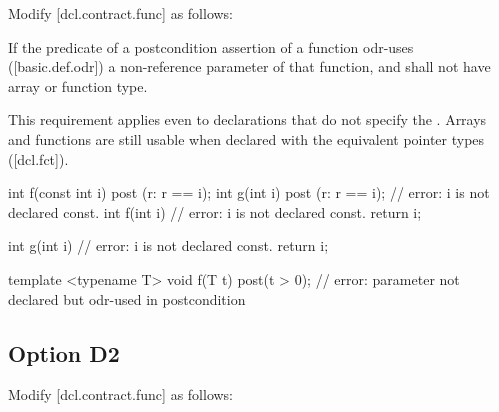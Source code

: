 Modify [dcl.contract.func] as follows:

\begin{adjustwidth}{0.5cm}{0.5cm}
If the predicate of a postcondition assertion of a function odr-uses ([basic.def.odr]) a
non-reference parameter of that function, and
shall not have array or function type.
\begin{note}
This requirement applies even to declarations that do not specify the . Arrays and functions are still usable when
declared with the equivalent pointer types ([dcl.fct]). 
\end{note}
\begin{example}
\begin{codeblock}
int f(const int i)
post (r: r == i);
int g(int i)
post (r: r == i); // error: i is not declared const.
int f(int i) // error: i is not declared const.
{
  return i;
}

int g(int i) // error: i is not declared const.
{
  return i;
}
\end{codeblock}
\begin{addedblock}
\begin{codeblock}
template <typename T>
void f(T t) post(t > 0);  // error: parameter not declared  but odr-used in postcondition 
\end{codeblock}
\end{addedblock}
\end{example}
\end{adjustwidth}

\subsection{Option D2}

Modify [dcl.contract.func] as follows:

